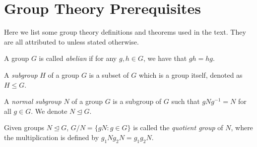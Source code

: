 \section{Group Theory Prerequisites}
Here we list some group theory definitions and theorems used in the text. They are all attributed to \cite{group-theory-uon, armstrong_groups_1988} unless stated otherwise.


\begin{definition}
	A group $G$ is called \textit{abelian} if for any $g, h \in G$, we have that $g h = h g$. 
\end{definition}

\begin{definition}
	A \textit{subgroup} $H$ of a group $G$ is a subset of $G$ which is a group itself, denoted as $H \le G$. 
\end{definition}

\begin{definition}
	A \textit{normal subgroup} $N$ of a group $G$ is a subgroup of $G$ such that $gNg^{-1} = N$ for all $g \in G$. We denote $N \trianglelefteq G$. 
\end{definition}



\begin{definition}
	Given groups $N \trianglelefteq G$, $G / N = \{g N : g \in G\}$ is called the \textit{quotient group} of $N$, where the multiplication is defined by $g_1N g_2N = g_1g_2N$. 
\end{definition}

